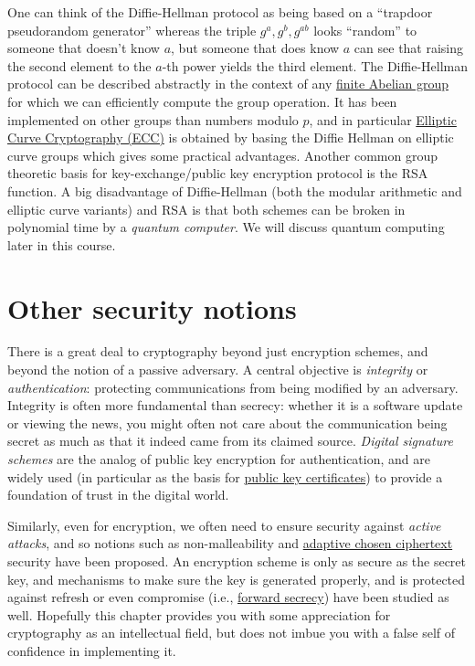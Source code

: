 One can think of the Diffie-Hellman protocol as being based on a
``trapdoor pseudorandom generator'' whereas the triple
\(g^a,g^{b},g^{ab}\) looks ``random'' to someone that doesn't know
\(a\), but someone that does know \(a\) can see that raising the second
element to the \(a\)-th power yields the third element. The
Diffie-Hellman protocol can be described abstractly in the context of
any \href{https://en.wikipedia.org/wiki/Abelian_group}{finite Abelian
group} for which we can efficiently compute the group operation. It has
been implemented on other groups than numbers modulo \(p\), and in
particular
\href{https://en.wikipedia.org/wiki/Elliptic-curve_cryptography}{Elliptic
Curve Cryptography (ECC)} is obtained by basing the Diffie Hellman on
elliptic curve groups which gives some practical advantages. Another
common group theoretic basis for key-exchange/public key encryption
protocol is the RSA function. A big disadvantage of Diffie-Hellman (both
the modular arithmetic and elliptic curve variants) and RSA is that both
schemes can be broken in polynomial time by a \emph{quantum computer}.
We will discuss quantum computing later in this course.

\section{Other security notions}\label{Other-security-notions}

There is a great deal to cryptography beyond just encryption schemes,
and beyond the notion of a passive adversary. A central objective is
\emph{integrity} or \emph{authentication}: protecting communications
from being modified by an adversary. Integrity is often more fundamental
than secrecy: whether it is a software update or viewing the news, you
might often not care about the communication being secret as much as
that it indeed came from its claimed source. \emph{Digital signature
schemes} are the analog of public key encryption for authentication, and
are widely used (in particular as the basis for
\href{https://en.wikipedia.org/wiki/Public_key_certificate}{public key
certificates}) to provide a foundation of trust in the digital world.

Similarly, even for encryption, we often need to ensure security against
\emph{active attacks}, and so notions such as non-malleability and
\href{https://en.wikipedia.org/wiki/Adaptive_chosen-ciphertext_attack}{adaptive
chosen ciphertext} security have been proposed. An encryption scheme is
only as secure as the secret key, and mechanisms to make sure the key is
generated properly, and is protected against refresh or even compromise
(i.e., \href{https://en.wikipedia.org/wiki/Forward_secrecy}{forward
secrecy}) have been studied as well. Hopefully this chapter provides you
with some appreciation for cryptography as an intellectual field, but
does not imbue you with a false self of confidence in implementing it.

